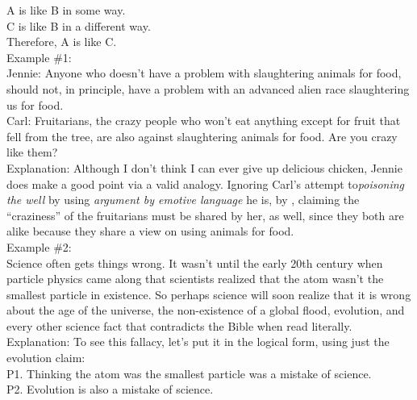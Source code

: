 \documentclass[a4paper,12pt,single,pdftex]{scrartcl}
\begin{document}
    
      A is like B in some way.
    \\

    
      C is like B in a different way.
    \\

    
      Therefore, A is like C.
    \\

    
      Example \#1:
    \\

    
      Jennie: Anyone who doesn’t have a problem with slaughtering animals for food, should not, in principle, have a problem with an advanced alien race slaughtering us for food.
    \\

    
      Carl: Fruitarians, the crazy people who won’t eat anything except for fruit that fell from the tree, are also against slaughtering animals for food.  Are you crazy like them?
    \\

    
      Explanation: Although I don’t think I can ever give up delicious chicken, Jennie does make a good point via a valid analogy.  Ignoring Carl’s attempt to{\it  poisoning the well }by using {\it argument by emotive language} he is, by{\it  
}, claiming the “craziness” of the fruitarians must be shared by her, as well, since they both are alike because they share a view on using animals for food.
    \\

    
      Example \#2:
    \\

    
      Science often gets things wrong.  It wasn’t until the early 20th century when particle physics came along that scientists realized that the atom wasn’t the smallest particle in existence.  So perhaps science will soon realize that it is wrong about the age of the universe, the non-existence of a global flood, evolution, and every other science fact that contradicts the Bible when read literally.
    \\

    
      Explanation: To see this fallacy, let’s put it in the logical form, using just the evolution claim:
    \\

    
      P1. Thinking the atom was the smallest particle was a mistake of science.
    \\

    
      P2. Evolution is also a mistake of science.
    \\
\end{document}
